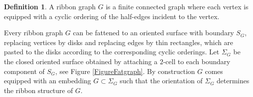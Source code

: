 \documentclass[JEP,XML,SOM,Unicode,NoFloatCountersInSection]{cedram}
\theoremstyle{plain}
\theoremstyle{definition}
\newtheorem{definition}[theorem]{Definition}
\begin{document}
\begin{definition} A ribbon graph $G$ is a finite connected graph where each vertex is equipped with a cyclic ordering of the half-edges incident to the vertex.
\end{definition}

Every ribbon graph $G$ can be fattened to an oriented surface with boundary $S_G$, replacing vertices by disks and replacing edges by thin rectangles, which are pasted to the disks according to the corresponding cyclic orderings. Let $\Sigma_G$ be the closed oriented surface obtained by attaching a $2$-cell to each boundary component of $S_G$, see Figure \ref{FigureFatgraph}. By construction $G$ comes equipped with an embedding $G \subset \Sigma_G$ such that the orientation of $\Sigma_G$ determines the ribbon structure of $G$.
\end{document}

